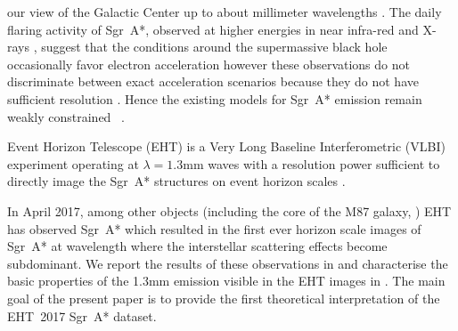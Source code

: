 our view of the Galactic Center up to about millimeter wavelengths \citep{2016ApJ...824...40O,2019A&A...621A.119B}. The daily flaring activity of Sgr~A*, observed at higher energies in near infra-red and X-rays \citep{2009ApJ...698..676D,2019ApJ...886...96H}, suggest that the conditions around the supermassive black hole occasionally favor electron acceleration however these observations do not discriminate between exact acceleration scenarios because they do not have sufficient resolution \citep{2000ApJ...541..234O}. Hence the existing models for Sgr~A* emission remain weakly constrained ~\citep[e.g.,][]{2005ApJ...621..785G,2006MNRAS.370..219M, 2007A&A...474....1M, 2007MNRAS.379.1519M,
  2009A&A...508L..13M, 2009ApJ...701..521C,
  2009ApJ...706..497M, 2012ApJ...746L..10D, 2012MNRAS.421.1315Z,
  2013A&A...559L...3M, 2014A&A...570A...7M, 2014ApJ...790....1B, 2015ApJ...799....1C,
  2015ApJ...802...69B,
  2015ApJ...812..103C, 2015Sci...350.1242J, 2016A&A...588A..57F,
  2016ApJ...826...77B,
  2016ApJ...831....4P, 2016MNRAS.455.2187M, 2017ApJ...837..180G,
  2017ApJ...844...35M, 2017ApJ...851..148M, 2017MNRAS.467.3604R,
  2018A&A...612A..34D, 2018ApJ...856..163M, 2018ApJ...859...60L,
  2018ApJ...863..148P, 2018ApJ...865..104J, 2018ApJ...868..101B,
  2018JCAP...07..015H, 2018MNRAS.478.1875J, 2018MNRAS.478.5209C,
  2019ApJ...881L...2B, 2019ApJ...884..148B, 
  2020ApJ...896L...6R, 2020ApJ...897...99T, 2020MNRAS.492.3272R,
  2020MNRAS.493.1404A, 2020MNRAS.494.4168D, 2020MNRAS.494.5923P,
  2020arXiv200514251B, 2020MNRAS.497.4999D, 2020arXiv200603658P,
  2020ApJ...896L...6R}.

Event Horizon Telescope (EHT) is a Very Long Baseline Interferometric (VLBI) experiment operating at $\lambda=1.3$mm waves with a resolution power sufficient to directly image the Sgr~A* structures on event horizon scales \citep{x}.

In April 2017, among other objects (including the core of the M87 galaxy, ) EHT has observed Sgr~A* which resulted in the first ever horizon scale images of Sgr~A* at wavelength where the interstellar scattering effects become subdominant. We report the results of these observations in  and characterise the basic properties of the 1.3mm emission visible in the EHT images in . The main goal of the present paper  is to provide the first theoretical interpretation of the EHT~2017 Sgr~A* dataset. 

